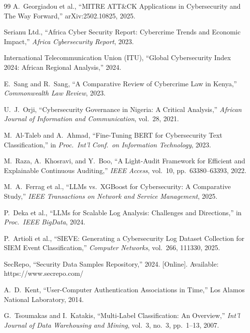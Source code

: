 \documentclass[11pt,conference]{IEEEtran}
\begin{document}
\begin{thebibliography}{99}
A.\ Georgiadou et al., ``MITRE ATT\&CK Applications in Cybersecurity and The Way Forward,'' arXiv:2502.10825, 2025.

Serianu Ltd., ``Africa Cyber Security Report: Cybercrime Trends and Economic Impact,'' \textit{Africa Cybersecurity Report}, 2023.

International Telecommunication Union (ITU), ``Global Cybersecurity Index 2024: African Regional Analysis,'' 2024.

E.\ Sang and R.\ Sang, ``A Comparative Review of Cybercrime Law in Kenya,'' \textit{Commonwealth Law Review}, 2023.

U.\ J.\ Orji, ``Cybersecurity Governance in Nigeria: A Critical Analysis,'' \textit{African Journal of Information and Communication}, vol.\ 28, 2021.

M.\ Al-Taleb and A.\ Ahmad, ``Fine-Tuning BERT for Cybersecurity Text Classification,'' in \textit{Proc.\ Int'l Conf.\ on Information Technology}, 2023.

M.\ Raza, A.\ Khosravi, and Y.\ Boo, ``A Light-Audit Framework for Efficient and Explainable Continuous Auditing,'' \textit{IEEE Access}, vol.\ 10, pp.\ 63380--63393, 2022.

M.\ A.\ Ferrag et al., ``LLMs vs.\ XGBoost for Cybersecurity: A Comparative Study,'' \textit{IEEE Transactions on Network and Service Management}, 2025.

P.\ Deka et al., ``LLMs for Scalable Log Analysis: Challenges and Directions,'' in \textit{Proc.\ IEEE BigData}, 2024.

P.\ Artioli et al., ``SIEVE: Generating a Cybersecurity Log Dataset Collection for SIEM Event Classification,'' \textit{Computer Networks}, vol.\ 266, 111330, 2025.

SecRepo, ``Security Data Samples Repository,'' 2024. [Online]. Available: https://www.secrepo.com/

A.\ D.\ Kent, ``User-Computer Authentication Associations in Time,'' Los Alamos National Laboratory, 2014.

G.\ Tsoumakas and I.\ Katakis, ``Multi-Label Classification: An Overview,'' \textit{Int'l Journal of Data Warehousing and Mining}, vol.\ 3, no.\ 3, pp.\ 1--13, 2007.


\end{thebibliography}
\end{document}
